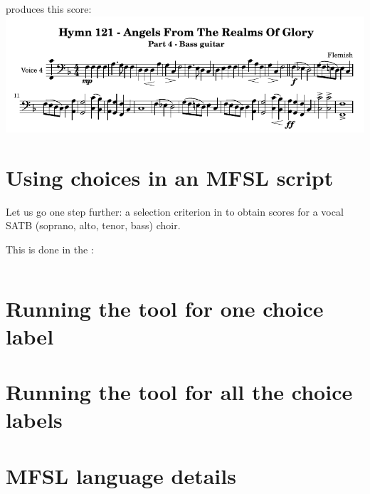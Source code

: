 produces this score:\\
\includegraphics[scale=0.8]{../graphics/Hymn121_BassGuitar.png}


\section{Using choices in an MFSL script}

Let us go one step further:  a selection criterion in  to obtain scores for a vocal SATB (soprano, alto, tenor, bass) choir.

This is done in the  \script:
\begin{lstlisting}[language=Terminal]

\end{lstlisting}


\section{Running the tool for one choice label}



\section{Running the tool for all the choice labels}


\section{MFSL language details}


